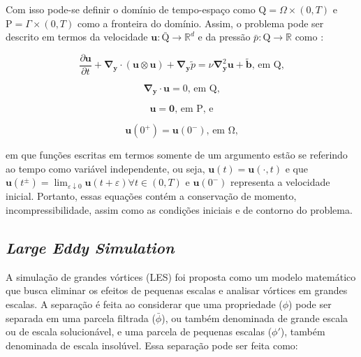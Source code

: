 \documentclass[_ArquivoPrincipal.tex]{subfiles}
\begin{document}
Com isso pode-se definir o domínio de tempo-espaço como $\mathrm{Q}=\Omega\times(0,T)$ e $\mathrm{P}=\Gamma\times(0,T)$ como a fronteira do domínio. Assim, o problema pode ser descrito em termos da velocidade $\mathbf{u}:\bar{\mathrm{Q}}\to\mathbb{R}^d$ e da pressão $\bar{p}:\mathrm{Q}\to\mathbb{R}$ como \cite{hughes2000large}:

\begin{equation}
    \frac{\partial\mathbf{u}}{\partial t}+\mathbf{\nabla}_\mathbf{y}\cdot(\mathbf{u}\otimes\mathbf{u})+\mathbf{\nabla}_\mathbf{y}\tilde{p}=\nu\mathbf{\nabla}^2_\mathbf{y}\mathbf{u}+\tilde{\mathbf{b}}\text{, em }\mathrm{Q}\text{,}
    \label{Sist1}
\end{equation}

\begin{equation}
    \mathbf{\nabla}_\mathbf{y}\cdot\mathbf{u}=0\text{, em }\mathrm{Q}\text{,}
    \label{Sist2}
\end{equation}

\begin{equation}
    \mathbf{u}=\mathbf{0}\text{, em }\mathrm{P}\text{, e}
    \label{Sist3}
\end{equation}

\begin{equation}
    \mathbf{u}(0^+)=\mathbf{u}(0^-)\text{, em }\mathrm{\Omega}\text{,}
    \label{Sist4}
\end{equation}

\noindent em que funções escritas em termos somente de um argumento estão se referindo ao tempo como variável independente, ou seja, $\mathbf{u}(t)=\mathbf{u}(\cdot,t)$ e que $\mathbf{u}(t^\pm)=\lim_{\varepsilon\downarrow0}{\mathbf{u}(t+\varepsilon)\forall t\in(0,T)}$ e $\mathbf{u}(0^-)$ representa a velocidade inicial. Portanto, essas equações contém a conservação de momento, incompressibilidade, assim como as condições iniciais e de contorno do problema.

\subsection{\textit{Large Eddy Simulation}} \label{LES}

A simulação de grandes vórtices (LES) foi proposta como um modelo matemático que busca eliminar os efeitos de pequenas escalas e analisar vórtices em grandes escalas. A separação é feita ao considerar que uma propriedade ($\phi$) pode ser separada em uma parcela filtrada ($\bar{\phi}$), ou também denominada de grande escala ou de escala solucionável, e uma parcela de pequenas escalas ($\phi'$), também denominada de escala insolúvel. Essa separação pode ser feita como:
\end{document}
